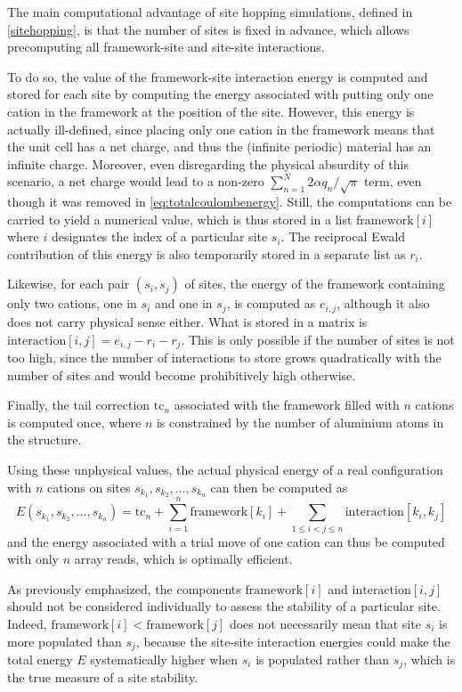 \documentclass[main.tex]{subfiles}
\begin{document}
The main computational advantage of site hopping simulations, defined in \cref{sitehopping}, is that the number of sites is fixed in advance, which allows precomputing all framework-site and site-site interactions.

To do so, the value of the framework-site interaction energy is computed and stored for each site by computing the energy associated with putting only one cation in the framework at the position of the site. However, this energy is actually ill-defined, since placing only one cation in the framework means that the unit cell has a net charge, and thus the (infinite periodic) material has an infinite charge. Moreover, even disregarding the physical absurdity of this scenario, a net charge would lead to a non-zero $\sum_{n=1}^N2\alpha q_n/\sqrt\pi$ term, even though it was removed in \cref{eq:totalcoulombenergy}. Still, the computations can be carried to yield a numerical value, which is thus stored in a list $\text{framework}[i]$ where $i$ designates the index of a particular site $s_i$. The reciprocal Ewald contribution of this energy is also temporarily stored in a separate list as $r_i$.

Likewise, for each pair $(s_i,s_j)$ of sites, the energy of the framework containing only two cations, one in $s_i$ and one in $s_j$, is computed as $e_{i,j}$, although it also does not carry physical sense either. What is stored in a matrix is
$\text{interaction}[i,j] = e_{i,j} - r_i - r_j$.
This is only possible if the number of sites is not too high, since the number of interactions to store grows quadratically with the number of sites and would become prohibitively high otherwise.

Finally, the tail correction $\text{tc}_n$ associated with the framework filled with $n$ cations is computed once, where $n$ is constrained by the number of aluminium atoms in the structure.

Using these unphysical values, the actual physical energy of a real configuration with $n$ cations on sites $s_{k_1}, s_{k_2}, \ldots, s_{k_n}$ can then be computed as
\[E(s_{k_1}, s_{k_2}, \ldots, s_{k_n}) = \text{tc}_n + \sum_{i=1}^n\text{framework}[k_i] + \sum_{1\le i<j \le n}\text{interaction}[k_i,k_j]\]
and the energy associated with a trial move of one cation can thus be computed with only $n$ array reads, which is optimally efficient.

As previously emphasized, the components $\text{framework}[i]$ and $\text{interaction}[i,j]$ should not be considered individually to assess the stability of a particular site. Indeed, $\text{framework}[i] < \text{framework}[j]$ does not necessarily mean that site $s_i$ is more populated than $s_j$, because the site-site interaction energies could make the total energy $E$ systematically higher when $s_i$ is populated rather than $s_j$, which is the true measure of a site stability.
\end{document}
